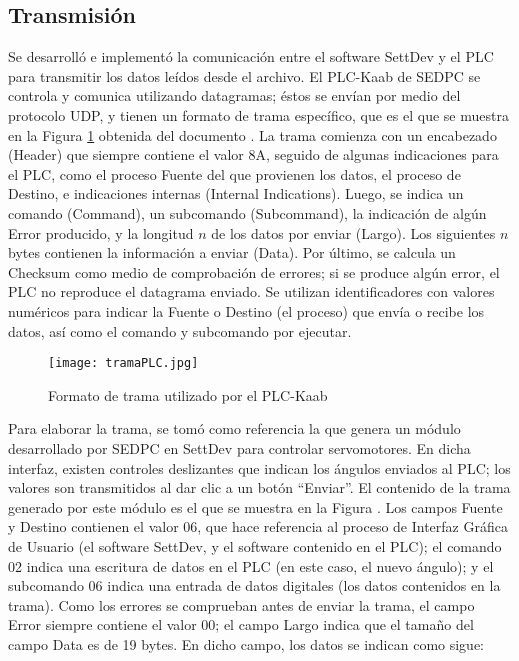 \subsection{Transmisión}

Se desarrolló e implementó la comunicación entre el software SettDev y el PLC para transmitir los datos leídos desde el archivo. El PLC-Kaab de SEDPC se controla y comunica utilizando datagramas; éstos se envían por medio del protocolo UDP, y tienen un formato de trama específico, que es el que se muestra en la Figura \ref{fig:tramaPLC} obtenida del documento . La trama comienza con un encabezado (Header) que siempre contiene el valor 8A, seguido de algunas indicaciones para el PLC, como el proceso Fuente del que provienen los datos, el proceso de Destino, e indicaciones internas (Internal Indications). Luego, se indica un comando (Command), un subcomando (Subcommand), la indicación de algún Error producido, y la longitud $n$ de los datos por enviar (Largo). Los siguientes $n$ bytes contienen la información a enviar (Data). Por último, se calcula un Checksum como medio de comprobación de errores; si se produce algún error, el PLC no reproduce el datagrama enviado. Se utilizan identificadores con valores numéricos para indicar la Fuente o Destino (el proceso) que envía o recibe los datos, así como el comando y subcomando por ejecutar.

\begin{figure}[htb]
	\centering
	\texttt{[image: tramaPLC.jpg]}
	\caption{Formato de trama utilizado por el PLC-Kaab}
	\label{fig:tramaPLC}
\end{figure}

Para elaborar la trama, se tomó como referencia la que genera un módulo desarrollado por SEDPC en SettDev para controlar servomotores. En dicha interfaz, existen controles deslizantes que indican los ángulos enviados al PLC; los valores son transmitidos al dar clic a un botón ``Enviar''. El contenido de la trama generado por este módulo es el que se muestra en la Figura . Los campos Fuente y Destino contienen el valor 06, que hace referencia al proceso de Interfaz Gráfica de Usuario (el software SettDev, y el software contenido en el PLC); el comando 02 indica una escritura de datos en el PLC (en este caso, el nuevo ángulo); y el subcomando 06 indica una entrada de datos digitales (los datos contenidos en la trama). Como los errores se comprueban antes de enviar la trama, el campo Error siempre contiene el valor 00; el campo Largo indica que el tamaño del campo Data es de 19 bytes. En dicho campo, los datos se indican como sigue:

